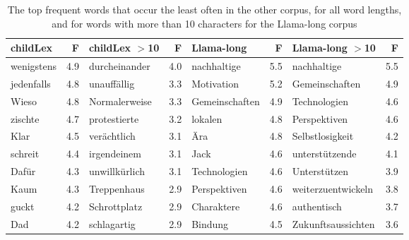 \documentclass[manuscript]{stjour}
\begin{document}
\begin{table}[!htbp]
\caption{The top frequent words that occur the least often in the other corpus, for all word lengths, and for words with more than 10 characters for the Llama-long corpus}
\centering
\begin{tabular}{lrlrlrlr}
  \hline
childLex & F & childLex $>$10 & F & Llama-long & F & Llama-long $>$10 & F \\ 
  \hline
wenigstens & 4.9 & durcheinander & 4.0 & nachhaltige & 5.5 & nachhaltige & 5.5 \\ 
  jedenfalls & 4.8 & unauffällig & 3.3 & Motivation & 5.2 & Gemeinschaften & 4.9 \\ 
  Wieso & 4.8 & Normalerweise & 3.3 & Gemeinschaften & 4.9 & Technologien & 4.6 \\ 
  zischte & 4.7 & protestierte & 3.2 & lokalen & 4.8 & Perspektiven & 4.6 \\ 
  Klar & 4.5 & verächtlich & 3.1 & Ära & 4.8 & Selbstlosigkeit & 4.2 \\ 
  schreit & 4.4 & irgendeinem & 3.1 & Jack & 4.6 & unterstützende & 4.1 \\ 
  Dafür & 4.3 & unwillkürlich & 3.1 & Technologien & 4.6 & Unterstützen & 3.9 \\ 
  Kaum & 4.3 & Treppenhaus & 2.9 & Perspektiven & 4.6 & weiterzuentwickeln & 3.8 \\ 
  guckt & 4.2 & Schrottplatz & 2.9 & Charaktere & 4.6 & authentisch & 3.7 \\ 
  Dad & 4.2 & schlagartig & 2.9 & Bindung & 4.5 & Zukunftsaussichten & 3.6 \\ 
   \hline
\end{tabular}
\label{words-lllo-low}
\end{table}

\clearpage
\end{document}
